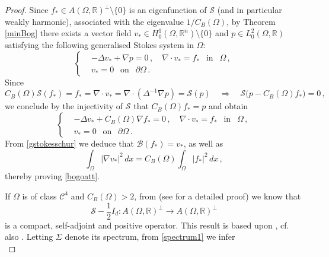 \documentclass[11pt]{article}
\theoremstyle{plain}
\theoremstyle{definition}
\numberwithin{equation}{section}
\newcommand{\R}{\mathbb{R}}
\begin{document}
\begin{proof} Since $f_{*} \in A(\Omega,\R)^{\perp} \setminus \{0\}$ is an eigenfunction of $\mathcal{S}$ (and in particular weakly harmonic), associated with the eigenvalue $1/C_{B}(\Omega)$, by Theorem \ref{minBog} there exists a vector field $v_{*} \in H_{0}^{1}(\Omega,\R^n) \setminus \{0\}$
	and $p\in L_{0}^{2}(\Omega,\R) $ satisfying the following generalised Stokes system in $\Omega$:
	\begin{equation*}
		\left\{
		\begin{aligned}
			& - \Delta v_{*} + \nabla p= 0 \, , \quad \nabla \cdot v_{*} = f_{*} \ \ \mbox{ in } \ \ \Omega \, , \\[5pt]
			& v_{*}=0 \ \ \mbox{ on } \ \ \partial \Omega  \, .
		\end{aligned}
		\right.
	\end{equation*}
	Since
	$$
	C_{B}(\Omega) \mathcal{S} (f_*)=f_*=\nabla\cdot v_*=\nabla\cdot \left( \Delta^{-1}\nabla p\right)=\mathcal{S}(p)
	\quad \Longrightarrow \quad \mathcal{S} \big(p-C_{B}(\Omega) f_{*} \big) = 0 \, ,
	$$
	we conclude by the injectivity of $ \mathcal{S}$ that $C_{B}(\Omega)f_*=p$ and obtain
\begin{equation} \label{gstokesschur}
	\left\{
	\begin{aligned}
		& - \Delta v_{*} + C_{B}(\Omega) \nabla f_{*} = 0 \, , \quad \nabla \cdot v_{*} = f_{*} \ \ \mbox{ in } \ \ \Omega \, , \\[5pt]
		& v_{*}=0 \ \ \mbox{ on } \ \ \partial \Omega  \, .
	\end{aligned}
	\right.
\end{equation}
From \eqref{gstokesschur} we deduce that $\mathcal{B}(f_{*}) = v_{*}$, as well as
$$
\int_{\Omega} | \nabla v_{*} |^{2} \, dx = C_{B}(\Omega) \int_{\Omega} | f_{*} |^{2} \, dx \, ,
$$
thereby proving \eqref{bogoatt}.\par
If $\Omega$ is of class $\mathcal{C}^{4}$ and $C_{B}(\Omega) > 2$, from \cite[Theorem 2.1]{riedl2013cosserat} (see \cite[Section 9.2]{riedl2010cosserat} for a detailed proof) we know that
\begin{equation}\label{defS-}
\mathcal{S} - \dfrac{1}{2} I_{d} : A(\Omega,\R)^{\perp} \longrightarrow A(\Omega,\R)^{\perp}
\end{equation}
is a compact, self-adjoint and positive operator. This result is based upon \cite[Corollary 4]{Crouzeix_1997}, cf. also \cite[p. 90]{weyers2006q}. Letting $\Sigma$ denote its spectrum, from \eqref{spectrum1} we infer
\begin{equation} \label{spectrum2}

\end{equation}
\end{proof}
\end{document}

